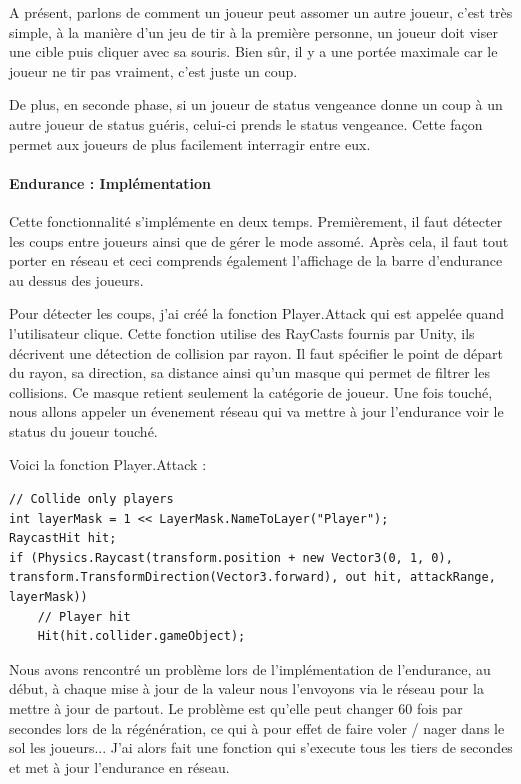 \documentclass{article}
\begin{document}
A présent, parlons de comment un joueur peut assomer un autre joueur, c'est très simple, à la manière d'un jeu de tir à la première personne, un joueur doit viser une cible puis cliquer avec sa souris. Bien sûr, il y a une portée maximale car le joueur ne tir pas vraiment, c'est juste un coup.

De plus, en seconde phase, si un joueur de status vengeance donne un coup à un autre joueur de status guéris, celui-ci prends le status vengeance. Cette façon permet aux joueurs de plus facilement interragir entre eux.

\paragraph{Endurance : Implémentation}

Cette fonctionnalité s'implémente en deux temps. Premièrement, il faut détecter les coups entre joueurs ainsi que de gérer le mode assomé. Après cela, il faut tout porter en réseau et ceci comprends également l'affichage de la barre d'endurance au dessus des joueurs.

Pour détecter les coups, j'ai créé la fonction Player.Attack qui est appelée quand l'utilisateur clique. Cette fonction utilise des RayCasts fournis par Unity, ils décrivent une détection de collision par rayon. Il faut spécifier le point de départ du rayon, sa direction, sa distance ainsi qu'un masque qui permet de filtrer les collisions. Ce masque retient seulement la catégorie de joueur.
Une fois touché, nous allons appeler un évenement réseau qui va mettre à jour l'endurance voir le status du joueur touché.

Voici la fonction Player.Attack :

\begin{lstlisting}
// Collide only players
int layerMask = 1 << LayerMask.NameToLayer("Player");
RaycastHit hit;
if (Physics.Raycast(transform.position + new Vector3(0, 1, 0), transform.TransformDirection(Vector3.forward), out hit, attackRange, layerMask))
	// Player hit
	Hit(hit.collider.gameObject);
\end{lstlisting}

Nous avons rencontré un problème lors de l'implémentation de l'endurance, au début, à chaque mise à jour de la valeur nous l'envoyons via le réseau pour la mettre à jour de partout. Le problème est qu'elle peut changer 60 fois par secondes lors de la régénération, ce qui à pour effet de faire voler / nager dans le sol les joueurs... J'ai alors fait une fonction qui s'execute tous les tiers de secondes et met à jour l'endurance en réseau.
\end{document}
